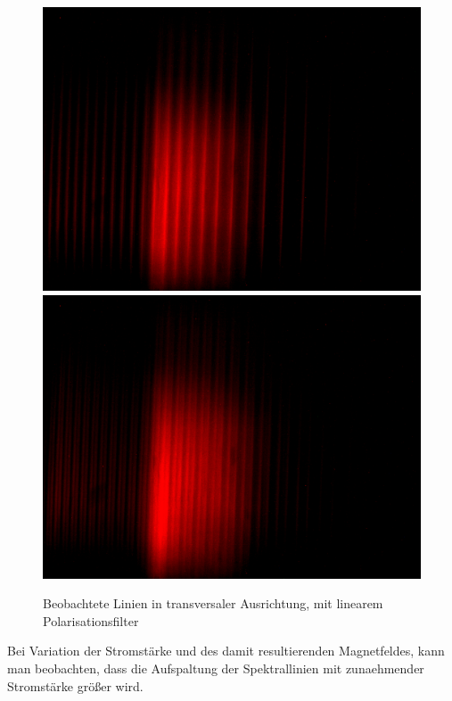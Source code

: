      \begin{figure}[H]
        \centering
        \includegraphics[width=.6\paperwidth, trim={0 300pt 0 900pt}, clip]{Auswertung/data/trans/10A/10A_pi}
        \includegraphics[width=.6\paperwidth, trim={0 300pt 0 900pt}, clip]{Auswertung/data/trans/10A/10A_sig}
        \caption{Beobachtete Linien in transversaler Ausrichtung, mit linearem Polarisationsfilter}
        \label{pic::3}
      \end{figure}

      Bei Variation der Stromstärke und des damit resultierenden Magnetfeldes, kann man beobachten, dass die Aufspaltung der Spektrallinien mit zunaehmender Stromstärke größer wird.

